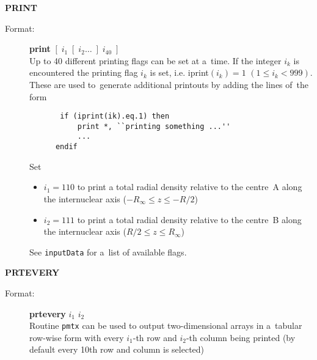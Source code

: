 \documentclass[12pt,a4paper]{article}
\newcommand{\ft}[1]{\texttt{#1}}
\begin{document}
\begin{description}
\item \textbf{PRINT}
\begin{description}
\item[Format:] \textbf{print} $[\; i_1 \; [\;i_2 \ldots \;] \;i_{40}\;]$ \\ Up to 40
  different printing flags can be set at a~time. If the integer $i_k$ is encountered the
  printing flag $i_k$ is set, i.e. iprint$(i_k)=1$ $(1 \leq i_k<999)$. These are used
  to~generate additional printouts by adding the lines of~the form
  \begin{verbatim}
       if (iprint(ik).eq.1) then
           print *, ``printing something ...''
           ...
      endif
    \end{verbatim}

Set
\begin{itemize}
\item $i_1=110$ to print a total radial density relative to the
  centre~A along the internuclear axis ($-R_{\infty}\le z\le -R/2$)

\item $i_2=111$ to print a total radial density relative to the
  centre~B along the internuclear axis ($R/2\le z\le R_{\infty}$)
\end{itemize}
See \ft{inputData} for a~list of available flags.

\end{description}


\item \textbf{PRTEVERY}
\begin{description}
\item[Format:] \textbf{prtevery} $i_1$ $i_2$ \\ Routine \ft{pmtx} can be used to output
  two-dimensional arrays in a~tabular row-wise form with every $i_1$-th row and $i_2$-th
  column being printed (by default every 10th row and column is selected)
\end{description}



\end{description}
\end{document}
